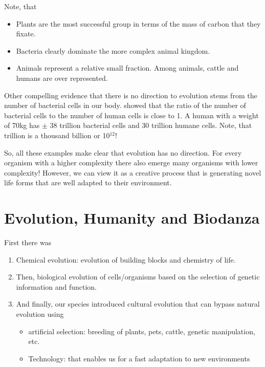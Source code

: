 \documentclass[
  11pt,
]{book}
\providecommand{\tightlist}{%
  \setlength{\itemsep}{0pt}\setlength{\parskip}{0pt}}
\begin{document}
Note, that

\begin{itemize}
\item
  Plants are the most successful group in terms of the mass of carbon that they fixate.
\item
  Bacteria clearly dominate the more complex animal kingdom.
\item
  Animals represent a relative small fraction. Among animals, cattle and humans are over represented.
\end{itemize}

Other compelling evidence that there is no direction to evolution stems from the number of bacterial cells in our body. \citet{Sender2016} showed that the ratio of the number of bacterial cells to the number of human cells is close to 1. A human with a weight of 70kg has \(\pm\) 38 trillion bacterial cells and 30 trillion humane cells. Note, that trillion is a thousand billion or 10\(^{12}\)!

So, all these examples make clear that evolution has no direction. For every organism with a higher complexity there also emerge many organisms with lower complexity! However, we can view it as a creative process that is generating novel life forms that are well adapted to their environment.

\hypertarget{evolution-humanity-and-biodanza}{%
\section{Evolution, Humanity and Biodanza}\label{evolution-humanity-and-biodanza}}

First there was

\begin{enumerate}
\def\labelenumi{\arabic{enumi}.}
\item
  Chemical evolution: evolution of building blocks and chemistry of life.
\item
  Then, biological evolution of cells/organisms based on the selection of genetic information and function.
\item
  And finally, our species introduced cultural evolution that can bypass natural evolution using

  \begin{itemize}
  \tightlist
  \item
    artificial selection: breeding of plants, pets, cattle, genetic manipulation, etc.
  \item
    Technology: that enables us for a fast adaptation to new environments
  \end{itemize}
\end{enumerate}
\end{document}
